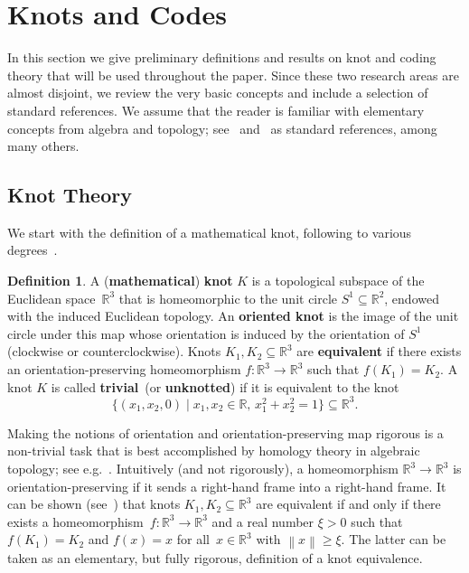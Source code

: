 \documentclass[11pt,a4paper]{article}
\theoremstyle{definition}
\newtheorem{definition}[theorem]{Definition}
\newcommand{\numberset}{\mathbb}
\newcommand{\R}{\numberset{R}}
\begin{document}
\section{Knots and Codes}
\label{sec:preliminaries}
\label{sec:1}
In this section we give preliminary definitions and results on knot and coding theory that will be used throughout the paper. 
Since these two research areas are almost disjoint, we review the very basic concepts and include a selection of standard references. 
We assume that the reader is familiar with  
elementary concepts from algebra and topology; see~\cite{lang2012algebra} and~\cite{munkres} as standard references, among many others. 




\subsection{Knot Theory}
\label{subsec:knot}
We start with the definition of a mathematical knot, following to various degrees~\cite{crowell2012introduction,livingston1993knot,kosniowski1980first,murasugi1996knot}. 

\begin{definition}
\label{def:knot}
A (\textbf{mathematical}) \textbf{knot} $K$ is a topological subspace of the Euclidean space~$\R^3$ that is homeomorphic to the unit circle $S^1 \subseteq \R^2$, endowed with the induced Euclidean topology. An \textbf{oriented knot} is the image of the unit circle under this map whose orientation is induced by the orientation of $S^1$ (clockwise or counterclockwise).
Knots $K_1, K_2 \subseteq \R^3$ are 
\textbf{equivalent} if there exists an orientation-preserving homeomorphism
$f: \R^3 \to \R^3$ such that
$f(K_1)=K_2$. A knot $K$ is called \textbf{trivial}~(or \textbf{unknotted}) if it is equivalent to the knot $$\{(x_1,x_2,0) \mid x_1, x_2 \in \R, \, x_1^2+x_2^2=1\} \subseteq \R^3.$$
\end{definition}

Making the notions of orientation
and orientation-preserving map
rigorous is 
a non-trivial task that is best accomplished by homology theory in algebraic topology; see e.g.~\cite[Chapter~22]{greenberg2018algebraic}.
Intuitively (and not rigorously), a homeomorphism $\R^3 \to \R^3$ is orientation-preserving if it sends a right-hand frame into a right-hand frame.
It can be shown (see~\cite[page~212]{kosniowski1980first}) that knots $K_1, K_2 \subseteq \R^3$ are equivalent if and only if there exists a homeomorphism~$f: \R^3 \to \R^3$ and a real number $\xi >0$ such that 
$f(K_1)=K_2$ and $f(x)=x$ for all~$x \in \R^3$ with $\left\| x\right\| \ge \xi$. The latter can be taken as an elementary, but fully rigorous, definition of a knot equivalence.
\end{document}
